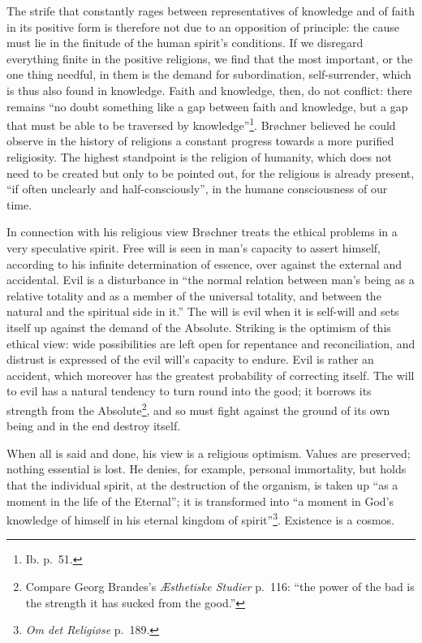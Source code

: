\documentclass[12pt,a4paper,openany]{book}
\newcommand{\opage}[1]{\marginnote{\footnotesize\textit{[#1]}}}
\begin{document}
The strife that constantly rages between representatives of knowledge and of faith in its positive form is
therefore not due to an opposition of principle: the cause must lie in the finitude of the human spirit's
conditions. If we disregard everything finite in the positive religions, we find that the most important, or the one
thing needful, in them is the demand for subordination, self-surrender, which is thus also found in knowledge. Faith
and knowledge, then, do not conflict: there remains ``no doubt something like a gap between faith and knowledge,
but a gap that must be able to be traversed by knowledge''\footnote{Ib. p.~51.}. Brøchner believed he could observe
in the history of religions a constant progress towards a more purified religiosity. The highest standpoint is the
religion of humanity, which does not need to be created but only to be pointed out, for the religious is already
present, ``if often unclearly and half-consciously'', in the humane consciousness of our time.

In connection with his religious view Brøchner treats the ethical problems in a very speculative spirit. Free will
is seen in man's capacity to assert himself, according to his infinite determination of essence, over against the
external and accidental. Evil is a disturbance in ``the normal relation between man's being as a relative totality
and as a member of the universal totality, and between the natural and the spiritual side in it.'' The will is evil
when it is self-will and sets itself up against the demand of the Absolute. Striking is the optimism of this
ethical view: wide possibilities are left open for repentance and reconciliation, and distrust is expressed of the
evil will's capacity to endure. Evil is rather an accident, which moreover has the greatest probability of
correcting itself. The will to evil has a natural tendency to turn round into the good;
\opage{156}\setcounter{footnote}{0}%
it borrows its strength from the Absolute\footnote{Compare Georg Brandes's \textit{Æsthetiske Studier} p.~116:
``the power of the bad is the strength it has sucked from the good.''}, and so must fight against the ground of its
own being and in the end destroy itself.

When all is said and done, his view is a religious optimism. Values are preserved; nothing essential is lost. He
denies, for example, personal immortality, but holds that the individual spirit, at the destruction of the organism,
is taken up ``as a moment in the life of the Eternal''; it is transformed into ``a moment in God's knowledge of
himself in his eternal kingdom of spirit''\footnote{\textit{Om det Religiøse} p.~189.}. Existence is a cosmos.
\end{document}
